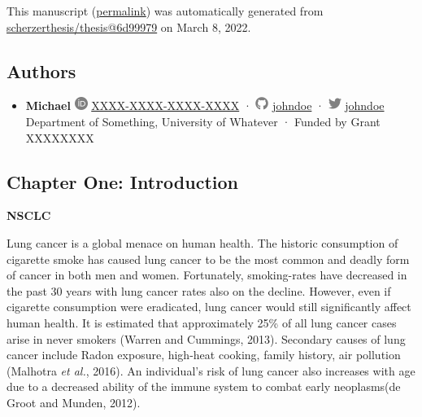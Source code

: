 This manuscript
(\href{https://scherzerthesis.github.io/thesis/v/6d999790895a2c1e1221abb5b70c9b11f5d4b2e5/}{permalink})
was automatically generated
from \href{https://github.com/scherzerthesis/thesis/tree/6d999790895a2c1e1221abb5b70c9b11f5d4b2e5}{scherzerthesis/thesis@6d99979}
on March 8, 2022.

\hypertarget{authors}{%
\subsection{Authors}\label{authors}}

\begin{itemize}
\tightlist
\item
  \textbf{Michael}
  \includegraphics[width=0.16667in,height=0.16667in]{images/orcid.svg}
  \href{https://orcid.org/XXXX-XXXX-XXXX-XXXX}{XXXX-XXXX-XXXX-XXXX}
  · \includegraphics[width=0.16667in,height=0.16667in]{images/github.svg}
  \href{https://github.com/johndoe}{johndoe}
  · \includegraphics[width=0.16667in,height=0.16667in]{images/twitter.svg}
  \href{https://twitter.com/johndoe}{johndoe}
  Department of Something, University of Whatever
  · Funded by Grant XXXXXXXX
\end{itemize}

\hypertarget{chapter-one-introduction}{%
\subsection{Chapter One: Introduction}\label{chapter-one-introduction}}

\textbf{NSCLC}

Lung cancer is a global menace on human health. The historic consumption of cigarette smoke has caused lung cancer to be the most common and deadly form of cancer in both men and women. Fortunately, smoking-rates have decreased in the past 30 years with lung cancer rates also on the decline. However, even if cigarette consumption were eradicated, lung cancer would still significantly affect human health. It is estimated that approximately 25\% of all lung cancer cases arise in never smokers (Warren and Cummings, 2013). Secondary causes of lung cancer include Radon exposure, high-heat cooking, family history, air pollution (Malhotra \emph{et al.}, 2016). An individual's risk of lung cancer also increases with age due to a decreased ability of the immune system to combat early neoplasms(de Groot and Munden, 2012).

